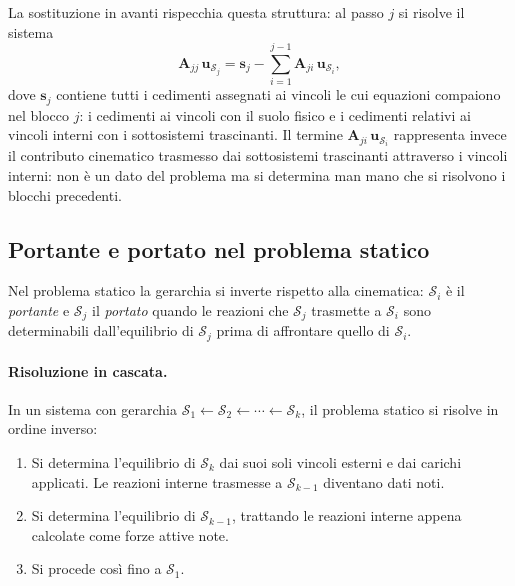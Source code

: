 	La sostituzione in avanti rispecchia questa
	struttura: al passo $j$ si risolve il sistema
	\begin{equation}
		\bm{A}_{jj}\,\bm{u}_{\mathcal{S}_j} =
		\bm{s}_j -
		\sum_{i=1}^{j-1}
		\bm{A}_{ji}\,\bm{u}_{\mathcal{S}_i},
	\end{equation}
	dove $\bm{s}_j$ contiene tutti i cedimenti
	assegnati ai vincoli le cui equazioni compaiono
	nel blocco $j$: i cedimenti ai vincoli con il
	suolo fisico e i cedimenti relativi ai vincoli
	interni con i sottosistemi trascinanti. Il termine
	$\bm{A}_{ji}\,\bm{u}_{\mathcal{S}_i}$ rappresenta
	invece il contributo cinematico trasmesso dai
	sottosistemi trascinanti attraverso i vincoli
	interni: non è un dato del problema ma si
	determina man mano che si risolvono i blocchi
	precedenti.

\subsection{Portante e portato nel problema statico}
\label{sec:portante}


Nel problema statico la gerarchia si inverte rispetto alla
cinematica: $\mathcal{S}_i$ è il
\emph{portante} e $\mathcal{S}_j$ il
\emph{portato} quando le reazioni che $\mathcal{S}_j$
trasmette a $\mathcal{S}_i$ sono determinabili dall'equilibrio
di $\mathcal{S}_j$ prima di affrontare quello di $\mathcal{S}_i$.

\paragraph{Risoluzione in cascata.}
In un sistema con gerarchia $\mathcal{S}_1 \leftarrow
\mathcal{S}_2 \leftarrow \cdots \leftarrow \mathcal{S}_k$,
il problema statico si risolve in ordine inverso:
\begin{enumerate}[label=(\arabic*), leftmargin=*,
	itemsep=2pt]
	\item Si determina l'equilibrio di $\mathcal{S}_k$
	dai suoi soli vincoli esterni e dai carichi applicati.
	Le reazioni interne trasmesse a $\mathcal{S}_{k-1}$
	diventano dati noti.
	\item Si determina l'equilibrio di $\mathcal{S}_{k-1}$,
	trattando le reazioni interne appena calcolate come
	forze attive note.
	\item Si procede così fino a $\mathcal{S}_1$.
\end{enumerate}


